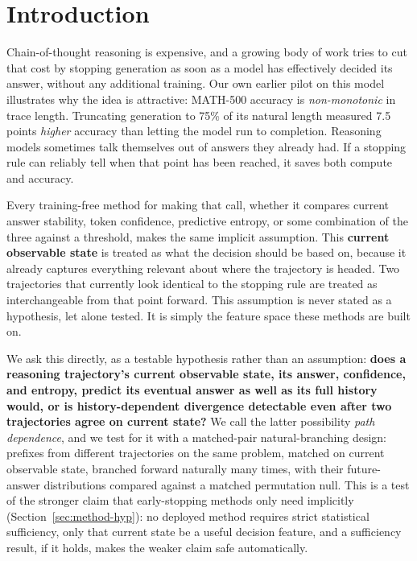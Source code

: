 \documentclass{article}
\begin{document}
\section{Introduction}
\label{sec:intro}

Chain-of-thought reasoning is expensive, and a growing body of work tries to cut that cost by stopping generation as soon as a model has effectively decided its answer, without any additional training. Our own earlier pilot on this model illustrates why the idea is attractive: MATH-500 accuracy is \emph{non-monotonic} in trace length. Truncating generation to 75\% of its natural length measured 7.5 points \emph{higher} accuracy than letting the model run to completion. Reasoning models sometimes talk themselves out of answers they already had. If a stopping rule can reliably tell when that point has been reached, it saves both compute and accuracy.

Every training-free method for making that call, whether it compares current answer stability, token confidence, predictive entropy, or some combination of the three against a threshold, makes the same implicit assumption. This \textbf{current observable state} is treated as what the decision should be based on, because it already captures everything relevant about where the trajectory is headed. Two trajectories that currently look identical to the stopping rule are treated as interchangeable from that point forward. This assumption is never stated as a hypothesis, let alone tested. It is simply the feature space these methods are built on.

We ask this directly, as a testable hypothesis rather than an assumption: \textbf{does a reasoning trajectory's current observable state, its answer, confidence, and entropy, predict its eventual answer as well as its full history would, or is history-dependent divergence detectable even after two trajectories agree on current state?} We call the latter possibility \emph{path dependence}, and we test for it with a matched-pair natural-branching design: prefixes from different trajectories on the same problem, matched on current observable state, branched forward naturally many times, with their future-answer distributions compared against a matched permutation null. This is a test of the stronger claim that early-stopping methods only need implicitly (Section~\ref{sec:method-hyp}): no deployed method requires strict statistical sufficiency, only that current state be a useful decision feature, and a sufficiency result, if it holds, makes the weaker claim safe automatically.
\end{document}
